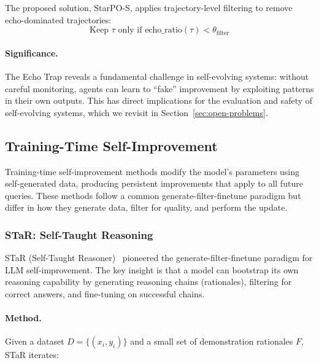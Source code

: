 The proposed solution, StarPO-S, applies trajectory-level filtering to remove echo-dominated trajectories:
\begin{equation}
    \text{Keep } \tau \text{ only if } \text{echo\_ratio}(\tau) < \theta_{\text{filter}}
\end{equation}

\paragraph{Significance.}
The Echo Trap reveals a fundamental challenge in self-evolving systems: without careful monitoring, agents can learn to ``fake'' improvement by exploiting patterns in their own outputs. This has direct implications for the evaluation and safety of self-evolving systems, which we revisit in Section~\ref{sec:open-problems}.

\subsection{Training-Time Self-Improvement}
\label{sec:training-time}

Training-time self-improvement methods modify the model's parameters using self-generated data, producing persistent improvements that apply to all future queries. These methods follow a common generate-filter-finetune paradigm but differ in how they generate data, filter for quality, and perform the update.

\subsubsection{STaR: Self-Taught Reasoning}
\label{sec:star}

STaR (Self-Taught Reasoner)~\citep{zelikman2022star} pioneered the generate-filter-finetune paradigm for LLM self-improvement. The key insight is that a model can bootstrap its own reasoning capability by generating reasoning chains (rationales), filtering for correct answers, and fine-tuning on successful chains.

\paragraph{Method.}
Given a dataset $D = \{(x_i, y_i)\}$ and a small set of demonstration rationales $F$, STaR iterates:

